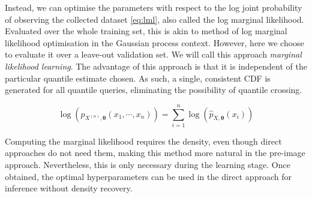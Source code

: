 \documentclass[twoside]{article} \usepackage{aistats2017}
\theoremstyle{definition}
\theoremstyle{theorem}
\newcommand{\rv}[1]{{#1}}
\begin{document}
	Instead, we can optimise the parameters with respect to the log joint probability of observing the collected dataset \eqref{eq:lml}, also called the log marginal likelihood. Evaluated over the whole training set, this is akin to method of log marginal likelihood optimisation in the Gaussian process context. However, here we choose to evaluate it over a leave-out validation set. We will call this approach \textit{marginal likelihood learning}. The advantage of this approach is that it is independent of the particular quantile estimate chosen. As such, a single, consistent CDF is generated for all quantile queries, eliminating the possibility of quantile crossing. 
	
	\begin{equation}
		\log(p_{\rv{X}^{(n)}, \bm{\theta}}(x_{1}, \cdots, x_{n}))= \sum_{i = 1}^{n} \log(\hat{p}_{\rv{X}, \bm{\theta}}(x_{i}))
	\label{eq:lml}
	\end{equation}
	
	Computing the marginal likelihood requires the density, even though direct approaches do not need them, making this method more natural in the pre-image approach. Nevertheless, this is only necessary during the learning stage. Once obtained, the optimal hyperparameters can be used in the direct approach for inference without density recovery.
	
\end{document}
